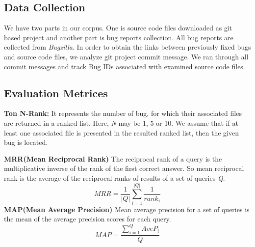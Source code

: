 \documentclass{sig-alternate}
\begin{document}
\subsection{Data Collection}
We have two parts in our corpus. One is source code files downloaded as git based project and another part is bug reports collection. All bug reports are collected from \textit{Bugzilla}. In order to obtain the links between previously fixed bugs and source code files, we analyze git project commit message. We ran through all commit messages and track Bug IDs associated with examined source code files.


\subsection{Evaluation Metrices}
\textbf{Ton N-Rank:} It represents the number of bug, for which their associated files are returned in a ranked list. Here, \textit{N} may be 1, 5 or 10. We assume that if at least one associated file is presented in the resulted ranked list, then the given bug is located.

\textbf{MRR(Mean Reciprocal Rank)}
The reciprocal rank of a query is the multiplicative inverse of the rank of the first correct answer. So mean reciprocal rank is the average of the reciprocal ranks of results of a set of queries \textit{Q}.
\begin{equation}
MRR=\frac{1}{\left | Q \right |}\sum_{i=1}^{\left | Q \right |}\frac{1}{rank_{i}}
\end{equation}
\textbf{MAP(Mean Average Precision)}
Mean average precision for a set of queries is the mean of the average precision scores for each query.
\begin{equation}
MAP=\frac{\sum_{i=1}^{Q}AveP_{i}}{Q}
\end{equation}
\end{document}
